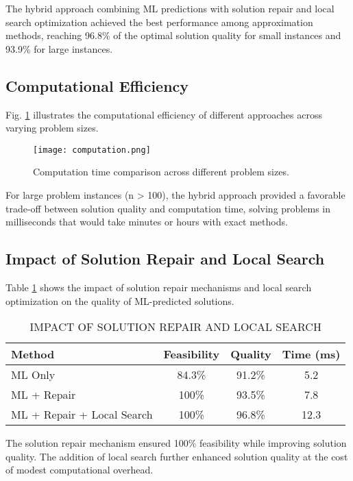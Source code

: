 \documentclass[conference, a4paper]{IEEEtran}
\begin{document}
The hybrid approach combining ML predictions with solution repair and local search optimization achieved the best performance among approximation methods, reaching 96.8\% of the optimal solution quality for small instances and 93.9\% for large instances.

\subsection{Computational Efficiency}
Fig. \ref{fig:computation_time} illustrates the computational efficiency of different approaches across varying problem sizes.

\begin{figure}[htbp]
\centerline{\texttt{[image: computation.png]}}
\caption{Computation time comparison across different problem sizes.}
\label{fig:computation_time}
\end{figure}

For large problem instances (n > 100), the hybrid approach provided a favorable trade-off between solution quality and computation time, solving problems in milliseconds that would take minutes or hours with exact methods.

\subsection{Impact of Solution Repair and Local Search}
Table \ref{tab:solution_repair} shows the impact of solution repair mechanisms and local search optimization on the quality of ML-predicted solutions.

\begin{table}[htbp]
\caption{IMPACT OF SOLUTION REPAIR AND LOCAL SEARCH}
\begin{center}
\begin{tabular}{|l|c|c|c|}
\hline
\textbf{Method} & \textbf{Feasibility} & \textbf{Quality} & \textbf{Time (ms)} \\
\hline
ML Only & 84.3\% & 91.2\% & 5.2 \\
\hline
ML + Repair & 100\% & 93.5\% & 7.8 \\
\hline
ML + Repair + Local Search & 100\% & 96.8\% & 12.3 \\
\hline
\end{tabular}
\label{tab:solution_repair}
\end{center}
\end{table}

The solution repair mechanism ensured 100\% feasibility while improving solution quality. The addition of local search further enhanced solution quality at the cost of modest computational overhead.
\end{document}
